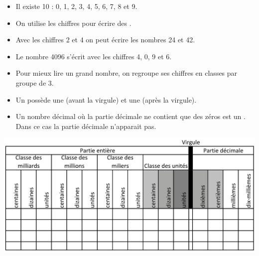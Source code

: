 \begin{mydef}
	\begin{itemize}
		\item Il existe 10  : 0, 1, 2, 3, 4, 5, 6, 7, 8 et 9.
		
		\item On utilise les chiffres pour écrire des .
		
		
	\end{itemize}
\end{mydef}

\begin{myexs}
	\begin{itemize}
		\item Avec les chiffres 2 et 4 on peut écrire les nombres 24 et 42.
		\item Le nombre \num{4096} s'écrit avec les chiffres 4, 0, 9 et 6.
		
	\end{itemize}
\end{myexs}





\begin{mydefs}
	\begin{itemize}
		\item Pour mieux lire un grand nombre, on regroupe ses chiffres en classes par groupe de 3.
		
		\item Un  possède une  (avant la virgule) et une  (après la virgule).
		
		\item Un nombre décimal où la partie décimale ne contient que des zéros est un . Dans ce cas la partie décimale n'apparait pas.
	\end{itemize}
\end{mydefs}

\begin{center}
	\includegraphics[scale=0.34]{img/tab_rangs}
\end{center}

